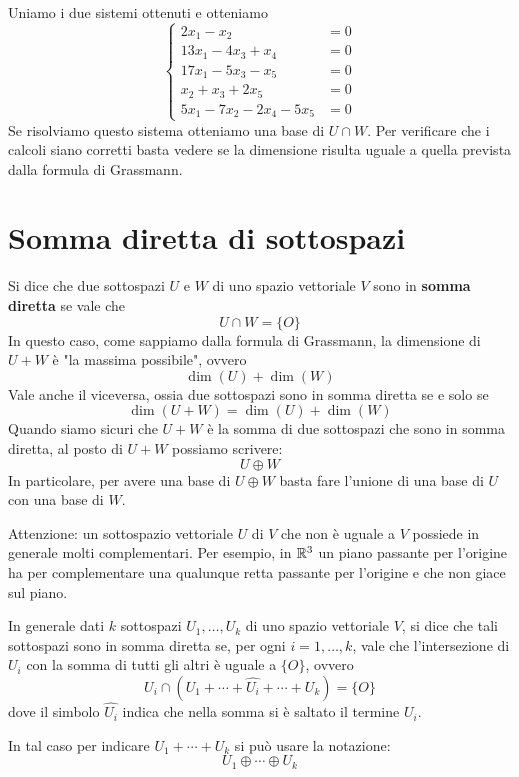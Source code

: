 Uniamo i due sistemi ottenuti e otteniamo
\[
	\begin{cases}
		2x_1 - x_2                & = 0 \\
		13x_1 - 4x_3 + x_4        & = 0 \\
		17x_1 - 5x_3 - x_5        & = 0 \\
		x_2 + x_3 + 2x_5          & = 0 \\
		5x_1 - 7x_2 - 2x_4 - 5x_5 & = 0
	\end{cases}
\]
Se risolviamo questo sistema otteniamo una base di $U \cap W$. Per verificare che i calcoli
siano corretti basta vedere se la dimensione risulta uguale a quella prevista dalla formula
di Grassmann.

\section{Somma diretta di sottospazi}
Si dice che due sottospazi $U$ e $W$ di uno spazio vettoriale $V$ sono in
\textbf{somma diretta} se vale che \[ U \cap W = \{O\} \] In questo caso,
come sappiamo dalla formula di Grassmann, la dimensione di $U + W$ è "la
massima possibile", ovvero \[ \dim(U) + \dim(W) \] Vale anche il
viceversa, ossia due sottospazi sono in somma diretta se e solo se
\[ \dim(U + W) = \dim(U) + \dim(W) \] Quando siamo sicuri che $U + W$ è la somma di due
sottospazi che sono in somma diretta, al posto di $U + W$ possiamo scrivere:
\[
	U \oplus W
\]
In particolare, per avere una base di $U \oplus W$ basta fare l'unione di una
base di $U$ con una base di $W$.

\begin{observation}
	Attenzione: un sottospazio vettoriale $U$ di $V$ che non è uguale a $V$
	possiede in generale molti complementari. Per esempio, in $\mathbb{R}^3$
	un piano passante per l'origine ha per complementare una qualunque retta
	passante per l'origine e che non giace sul piano.
\end{observation}

In generale dati $k$ sottospazi $U_1, \dots, U_k$ di uno spazio vettoriale $V$,
si dice che tali sottospazi sono in somma diretta se, per ogni
$i = 1, \dots, k$, vale che l'intersezione di $U_i$ con la somma di tutti
gli altri è uguale a $\{O\}$, ovvero
\[
	U_i \cap (U_1 + \cdots + \hat{U_i} + \cdots + U_k) = \{O\}
\]
dove il simbolo $\hat{U_i}$ indica che nella somma si è saltato il termine
$U_i$.

In tal caso per indicare $U_1 + \cdots + U_k$ si può usare la notazione:
\[
	U_1 \oplus \cdots \oplus U_k
\]
